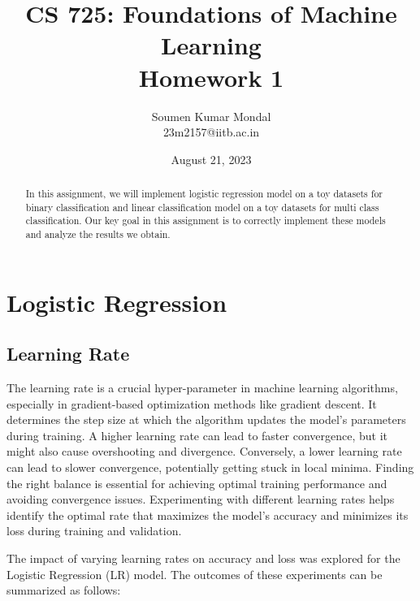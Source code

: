 \documentclass[12pt, a4paper, twoside]{article}
\title{\vspace{-0.5in}\textbf{CS 725: Foundations of Machine Learning \\
Homework 1}}
\author{Soumen Kumar Mondal\\
23m2157@iitb.ac.in}
\date{August  21, 2023}
\begin{document}
\maketitle
\thispagestyle{fancy}
\begin{abstract}
In this assignment, we will implement logistic regression model on a toy datasets for binary classification and linear classification model on a toy datasets for multi class classification. Our key goal in this assignment is to correctly implement these models and analyze the results we obtain.
\end{abstract}
		
\section{Logistic Regression}\label{S:LR}
\subsection{Learning Rate}\label{SS:lr-rate}
The learning rate is a crucial hyper-parameter in machine learning algorithms, especially in gradient-based optimization methods like gradient descent. It determines the step size at which the algorithm updates the model's parameters during training. A higher learning rate can lead to faster convergence, but it might also cause overshooting and divergence. Conversely, a lower learning rate can lead to slower convergence, potentially getting stuck in local minima. Finding the right balance is essential for achieving optimal training performance and avoiding convergence issues. Experimenting with different learning rates helps identify the optimal rate that maximizes the model's accuracy and minimizes its loss during training and validation.
\par
The impact of varying learning rates on accuracy and loss was explored for the Logistic Regression (LR) model. The outcomes of these experiments can be summarized as follows:
\end{document}

